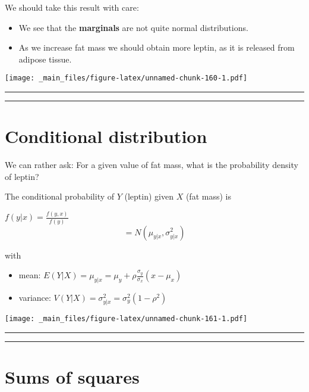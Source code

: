 \documentclass[
]{book}
\providecommand{\tightlist}{%
  \setlength{\itemsep}{0pt}\setlength{\parskip}{0pt}}
\begin{document}
We should take this result with care:

\begin{itemize}
\tightlist
\item
  We see that the \textbf{marginals} are not quite normal distributions.
\item
  As we increase fat mass we should obtain more leptin, as it is released from adipose tissue.
\end{itemize}

\texttt{[image: \_main\_files/figure-latex/unnamed-chunk-160-1.pdf]}

\begin{center}\rule{0.5\linewidth}{0.5pt}\end{center}

\begin{center}\rule{0.5\linewidth}{0.5pt}\end{center}

\hypertarget{conditional-distribution}{%
\section{Conditional distribution}\label{conditional-distribution}}

We can rather ask: For a given value of fat mass, what is the probability density of leptin?

The conditional probability of \(Y\) (leptin) given \(X\) (fat mass) is

\(f(y|x)=\frac{f(y,x)}{f(y)}\)
\[=N(\mu_{y|x}, \sigma^2_{y|x})\]

with

\begin{itemize}
\item
  mean: \(E(Y|X)=\mu_{y|x}=\mu_y+\rho\frac{\sigma_y}{\sigma_x}(x-\mu_x)\)
\item
  variance: \(V(Y|X)=\sigma^2_{y|x}= \sigma_y^2(1-\rho^2)\)
\end{itemize}

\texttt{[image: \_main\_files/figure-latex/unnamed-chunk-161-1.pdf]}

\begin{center}\rule{0.5\linewidth}{0.5pt}\end{center}

\begin{center}\rule{0.5\linewidth}{0.5pt}\end{center}

\hypertarget{sums-of-squares}{%
\section{Sums of squares}\label{sums-of-squares}}
\end{document}
